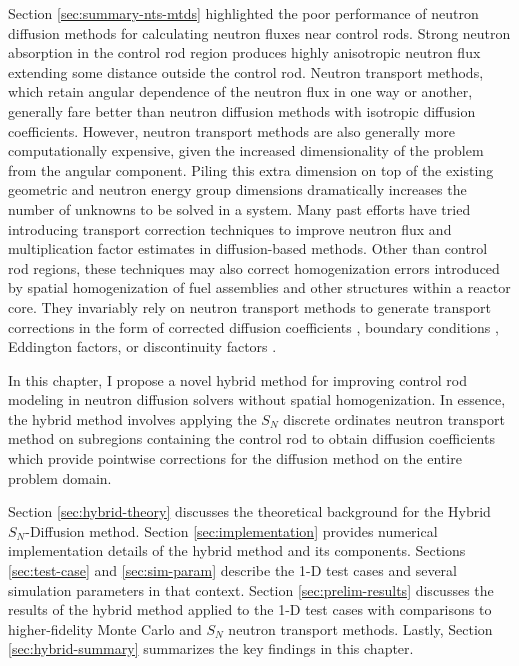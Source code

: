 Section \ref{sec:summary-nts-mtds} highlighted the poor performance of neutron diffusion
methods for calculating neutron fluxes near control rods. Strong neutron absorption in the control
rod region produces highly anisotropic neutron flux extending some distance outside the control
rod. Neutron transport methods, which retain angular dependence of the neutron flux in one way or
another, generally fare better than neutron diffusion methods with isotropic diffusion
coefficients. However, neutron transport methods are also generally more computationally expensive,
given the increased dimensionality of the problem from the angular component. Piling this extra
dimension on top of the existing geometric and neutron energy group dimensions dramatically
increases the number of unknowns to be solved in a system. Many past efforts have tried introducing
transport correction techniques to improve neutron flux and multiplication factor estimates in
diffusion-based methods. Other than control rod regions, these techniques may also correct
homogenization errors introduced by spatial homogenization of fuel assemblies and other
structures within a reactor core. They invariably rely on neutron transport methods to generate
transport corrections in the form of corrected diffusion coefficients
\cite{bretscher_computing_1997, scherer_determination_1976, ronen_accurate_2004,
pounders_diffusion_2009, kavenoky_sph_1978}, boundary conditions \cite{davison_influence_1951,
pellaud_extrapolation_1968, fen_modelling_1992}, Eddington factors, or discontinuity factors
\cite{koebke_new_1980}.

In this chapter, I propose a novel hybrid method for improving control rod modeling in neutron
diffusion solvers without spatial homogenization. In essence, the hybrid method involves applying
the $S_N$ discrete ordinates neutron transport method on subregions containing the control rod to
obtain diffusion coefficients which provide pointwise corrections for the diffusion method on the
entire problem domain.

Section \ref{sec:hybrid-theory} discusses the theoretical background for the Hybrid $S_N$-Diffusion
method. Section \ref{sec:implementation} provides numerical implementation details of
the hybrid method and its components. Sections \ref{sec:test-case} and \ref{sec:sim-param} describe
the 1-D test cases and several simulation parameters in that context. Section
\ref{sec:prelim-results} discusses the results of the hybrid method applied to the 1-D test cases
with comparisons to higher-fidelity Monte Carlo and $S_N$ neutron transport methods. Lastly,
Section \ref{sec:hybrid-summary} summarizes the key findings in this chapter.

